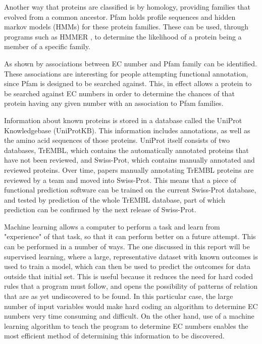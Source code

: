 \documentclass[12pt]{report}
\begin{document}
		Another way that proteins are classified is by homology, providing families that evolved from a common ancestor.  Pfam \citep{RefWorks:doc:5d6e641de4b0a51fb0eed90f} holds profile sequences and hidden markov models (HMMs) for these protein families. These can be used, through programs such as HMMER \citep{RefWorks:doc:5c8f77ece4b077fbbf563f6a}, to determine the likelihood of a protein being a member of a specific family. %
		
		As shown by \citep{RefWorks:doc:5d6f9c26e4b0ec3eed182252} associations between EC number and Pfam family can be identified.  These associations are interesting for people attempting functional annotation, since Pfam is designed to be searched against.  This, in effect allows a protein to be searched against EC numbers in order to determine the chances of that protein having any given number with an association to Pfam families. %
		
		Information about known proteins is stored in a database called the UniProt Knowledgebase (UniProtKB).  This information includes annotations, as well as the amino acid sequences of those proteins.  UniProt itself consists of two databases, TrEMBL, which contains the automatically annotated proteins that have not been reviewed, and Swiss-Prot, which contains manually annotated and reviewed proteins.  Over time, papers manually annotating TrEMBL proteins are reviewed by a team and moved into Swiss-Prot.  This means that a piece of functional prediction software can be trained on the current Swiss-Prot database, and tested by prediction of the whole TrEMBL database, part of which prediction can be confirmed by the next release of Swiss-Prot. %
		
		Machine learning allows a computer to perform a task and learn from "experience" of that task, so that it can perform better on a future attempt.  This can be performed in a number of ways.  The one discussed in this report will be supervised learning, where a large, representative dataset with known outcomes is used to train a model, which can then be used to predict the outcomes for data outside that initial set.  This is useful because it reduces the need for hard coded rules that a program must follow, and opens the possibility of patterns of relation that are as yet undiscovered to be found.  In this particular case, the large number of input variables would make hard coding an algorithm to determine EC numbers very time consuming and difficult.  On the other hand, use of a machine learning algorithm to teach the program to determine EC numbers enables the most efficient method of determining this information to be discovered.%
		
\end{document}
